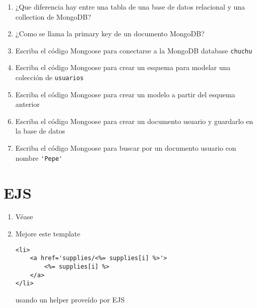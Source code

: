 \documentclass[spanish,a4paper,11pt]{article}
\begin{document}
\begin{enumerate}
\item 
¿Que diferencia hay entre una tabla de una base de datos relacional y una collection de MongoDB?
\item 
¿Como se llama la primary key de un documento MongoDB?
\item 
Escriba el código Mongoose para conectarse a la MongoDB database \verb|chuchu|
\item 
Escriba el código Mongoose para crear un esquema para modelar una colección de \verb|usuarios|
\item 
Escriba el código Mongoose para crear un modelo a partir del esquema anterior
%
%
\item 
Escriba el código Mongoose para crear un documento usuario y guardarlo en la base de datos

%
%
%
%
\item 
Escriba el código Mongoose para buscar por un documento usuario con nombre \verb|'Pepe'|
%
\end{enumerate}

\section{EJS}

\begin{enumerate}
\item 
Véase 
\item  Mejore este template
\begin{verbatim}
<li>
    <a href='supplies/<%= supplies[i] %>'>
        <%= supplies[i] %>
    </a>
</li>
\end{verbatim}
usando un helper proveído por EJS
\end{enumerate}
\end{document}
